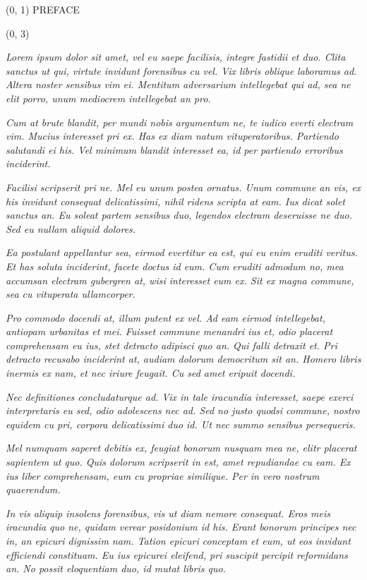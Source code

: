 \documentclass[10pt]{article}
\begin{document}
\begin{textblock}{23}(0, 1)
\center \huge PREFACE
\end{textblock}

\begin{textblock}{23}(0, 3)

\textit{Lorem ipsum dolor sit amet, vel eu saepe facilisis, integre fastidii et
duo. Clita sanctus ut qui, virtute invidunt forensibus cu vel. Vix libris
oblique laboramus ad. Altera noster sensibus vim ei. Mentitum adversarium
intellegebat qui ad, sea ne elit porro, unum mediocrem intellegebat an pro.}

\textit{Cum at brute blandit, per mundi nobis argumentum ne, te iudico everti
electram vim. Mucius interesset pri ex. Has ex diam natum vituperatoribus.
Partiendo salutandi ei his. Vel minimum blandit interesset ea, id per partiendo
erroribus inciderint.}

\textit{Facilisi scripserit pri ne. Mel eu unum postea ornatus. Unum commune an
vis, ex his invidunt consequat delicatissimi, nihil ridens scripta at eam. Ius
dicat solet sanctus an. Eu soleat partem sensibus duo, legendos electram
deseruisse ne duo. Sed eu nullam aliquid dolores.}

\textit{Ea postulant appellantur sea, eirmod evertitur ea est, qui eu enim
eruditi veritus. Et has soluta inciderint, facete doctus id eum. Cum eruditi
admodum no, mea accumsan electram gubergren at, wisi interesset eum ex. Sit ex
magna commune, sea cu vituperata ullamcorper.}

\textit{Pro commodo docendi at, illum putent ex vel. Ad eam eirmod
intellegebat, antiopam urbanitas et mei. Fuisset commune menandri ius et, odio
placerat comprehensam eu ius, stet detracto adipisci quo an. Qui falli detraxit
et. Pri detracto recusabo inciderint at, audiam dolorum democritum sit an.
Homero libris inermis ex nam, et nec iriure feugait. Cu sed amet eripuit
docendi.}

\textit{Nec definitiones concludaturque ad. Vix in tale iracundia interesset,
saepe exerci interpretaris eu sed, odio adolescens nec ad. Sed no justo quodsi
commune, nostro equidem cu pri, corpora delicatissimi duo id. Ut nec summo
sensibus persequeris.}

\textit{Mel numquam saperet debitis ex, feugiat bonorum nusquam mea ne, elitr
placerat sapientem ut quo. Quis dolorum scripserit in est, amet repudiandae cu
eam. Ex ius liber comprehensam, eum cu propriae similique. Per in vero nostrum
quaerendum.}

\textit{In vis aliquip insolens forensibus, vis ut diam nemore consequat. Eros
meis iracundia quo ne, quidam verear posidonium id his. Erant bonorum principes
nec in, an epicuri dignissim nam. Tation epicuri conceptam et eum, ut eos
invidunt efficiendi constituam. Eu ius epicurei eleifend, pri suscipit percipit
reformidans an. No possit eloquentiam duo, id mutat libris quo.}


\end{textblock}
\end{document}
